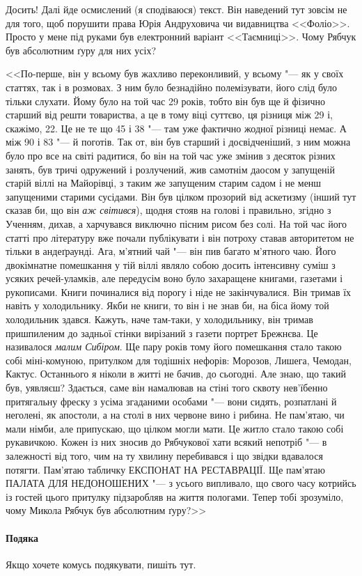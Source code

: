 Досить! Далі йде осмислений (я сподіваюся) текст. Він наведений
тут зовсім не для того, щоб порушити  права Юрія Андруховича чи
видавництва <<Фоліо>>. Просто у мене під руками був електронний
варіант <<Таємниці>>. Чому Рябчук був абсолютним ґуру для них
усіх?

<<По-перше, він у всьому був жахливо переконливий, у всьому "---
як у своїх статтях, так і в розмовах. З ним було безнадійно
полемізувати, його слід було тільки слухати. Йому було на той час
29 років, тобто він був ще й фізично старший від решти товариства,
а це в тому віці суттєво, ця різниця між 29 і, скажімо, 22. Це не
те що 45 і 38 "--- там уже фактично жодної різниці немає. А між 90
і 83 "--- й поготів. Так от, він був старший і досвідченіший, з
ним можна було про все на світі радитися, бо він на той час уже
змінив з десяток різних занять, був тричі одружений і розлучений,
жив самотнім даосом у запущеній старій віллі на Майорівці, з таким
же запущеним старим садом і не менш запущеними старими сусідами.
Він був цілком прозорий від аскетизму (інший тут сказав би, що він
\emph{аж світився}), щодня стояв на голові і правильно, згідно з
Ученням, дихав, а харчувався виключно пісним рисом без солі. На
той час його статті про літературу вже почали публікувати і він
потроху ставав авторитетом не тільки в андеґраунді. Ага, м'ятний
чай "--- він пив багато м'ятного чаю. Його двокімнатне помешкання
у тій віллі являло собою досить інтенсивну суміш з усяких
речей-уламків, але передусім воно було захаращене книгами,
газетами і рукописами. Книги починалися від порогу і ніде не
закінчувалися. Він тримав їх навіть у холодильнику. Якби не книги,
то він і не знав би, на біса йому той холодильник здався. Кажуть,
наче там-таки, у холодильнику, він тримав пришпиленим до задньої
стінки вирізаний з газети портрет Брежнєва. Це називалося
\emph{малим Сибіром}. Ще пару років тому його помешкання стало
такою собі міні-комуною, притулком для тодішніх нефорів: Морозов,
Лишега, Чемодан, Кактус. Останнього я ніколи в житті не бачив, до
сьогодні. Але знаю, що такий був, уявляєш? Здається, саме він
намалював на стіні того сквоту нев'їбенно притягальну фреску з
усіма згаданими особами "--- вони сидять, розпатлані й неголені,
як апостоли, а на столі в них червоне вино і рибина. Не пам'ятаю,
чи мали німби, але припускаю, що цілком могли мати. Це житло стало
такою собі рукавичкою. Кожен із них зносив до Рябчукової хати
всякий непотріб "--- в залежності від того, чим на ту хвилину
перебивався і що звідки вдавалося потягти. Пам'ятаю табличку
ЕКСПОНАТ НА РЕСТАВРАЦІЇ. Ще пам'ятаю ПАЛАТА ДЛЯ НЕДОНОШЕНИХ "--- з
усього випливало, що свого часу котрийсь із гостей цього притулку
підзаробляв на життя пологами. Тепер тобі зрозуміло, чому Микола
Рябчук був абсолютним ґуру?>>


\paragraph{Подяка}

Якщо хочете комусь подякувати, пишіть тут.
